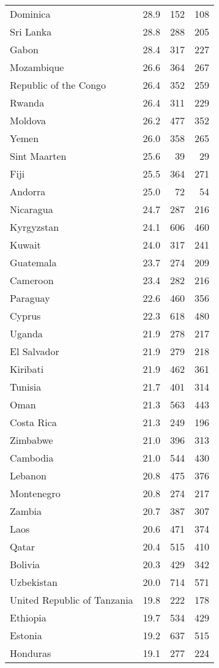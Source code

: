 \begin{table}[htbp]
\begin{tabular}{lrrr}
Dominica & 28.9 & 152 & 108 \\
Sri Lanka & 28.8 & 288 & 205 \\
Gabon & 28.4 & 317 & 227 \\
Mozambique & 26.6 & 364 & 267 \\
Republic of the Congo & 26.4 & 352 & 259 \\
Rwanda & 26.4 & 311 & 229 \\
Moldova & 26.2 & 477 & 352 \\
Yemen & 26.0 & 358 & 265 \\
Sint Maarten & 25.6 & 39 & 29 \\
Fiji & 25.5 & 364 & 271 \\
Andorra & 25.0 & 72 & 54 \\
Nicaragua & 24.7 & 287 & 216 \\
Kyrgyzstan & 24.1 & 606 & 460 \\
Kuwait & 24.0 & 317 & 241 \\
Guatemala & 23.7 & 274 & 209 \\
Cameroon & 23.4 & 282 & 216 \\
Paraguay & 22.6 & 460 & 356 \\
Cyprus & 22.3 & 618 & 480 \\
Uganda & 21.9 & 278 & 217 \\
El Salvador & 21.9 & 279 & 218 \\
Kiribati & 21.9 & 462 & 361 \\
Tunisia & 21.7 & 401 & 314 \\
Oman & 21.3 & 563 & 443 \\
Costa Rica & 21.3 & 249 & 196 \\
Zimbabwe & 21.0 & 396 & 313 \\
Cambodia & 21.0 & 544 & 430 \\
Lebanon & 20.8 & 475 & 376 \\
Montenegro & 20.8 & 274 & 217 \\
Zambia & 20.7 & 387 & 307 \\
Laos & 20.6 & 471 & 374 \\
Qatar & 20.4 & 515 & 410 \\
Bolivia & 20.3 & 429 & 342 \\
Uzbekistan & 20.0 & 714 & 571 \\
United Republic of Tanzania & 19.8 & 222 & 178 \\
Ethiopia & 19.7 & 534 & 429 \\
Estonia & 19.2 & 637 & 515 \\
Honduras & 19.1 & 277 & 224 \\

\end{tabular}
\end{table}
